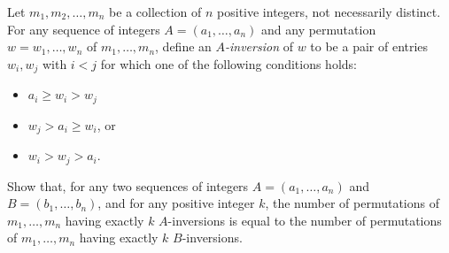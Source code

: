 Let $m_1, m_2, \ldots, m_n$ be a collection of $n$ positive integers, not necessarily distinct. For any sequence of integers $A = (a_1, \ldots, a_n)$ and any permutation $w = w_1, \ldots, w_n$ of $m_1, \ldots, m_n$, define an \emph{$A$-inversion} of $w$ to be a pair of entries $w_i, w_j$ with $i < j$ for which one of the following conditions holds:
\begin{itemize}
	\item $a_i \ge w_i > w_j$
	\item $w_j > a_i \ge w_i$, or
	\item $w_i > w_j > a_i$.
\end{itemize}
Show that, for any two sequences of integers $A = (a_1, \ldots, a_n)$ and $B = (b_1, \ldots, b_n)$, and for any positive integer $k$, the number of permutations of $m_1, \ldots, m_n$ having exactly $k$ $A$-inversions is equal to the number of permutations of $m_1, \ldots, m_n$ having exactly $k$ $B$-inversions.